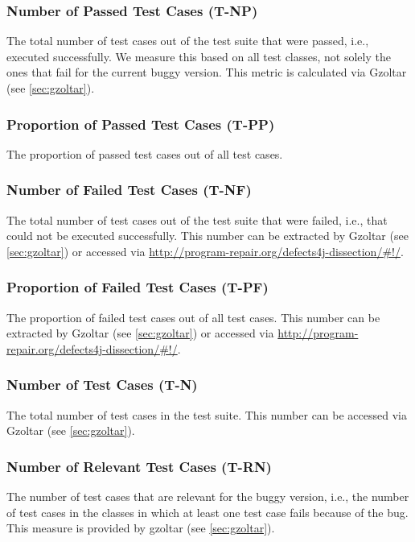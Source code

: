 \documentclass{scrartcl}
\begin{document}
\subsubsection{Number of Passed Test Cases (T-NP)}

The total number of test cases out of the test suite that were passed, i.e.,
executed successfully. We measure this based on all test classes, not solely
the ones that fail for the current buggy version. This metric is calculated via
Gzoltar (see \ref{sec:gzoltar}).

\subsubsection{Proportion of Passed Test Cases (T-PP)}

The proportion of passed test cases out of all test cases.

\subsubsection{Number of Failed Test Cases (T-NF)}

The total number of test cases out of the test suite that were failed, i.e.,
that could not be executed successfully. This number can be extracted by Gzoltar
(see \ref{sec:gzoltar}) or accessed via
\url{http://program-repair.org/defects4j-dissection/#!/}.

\subsubsection{Proportion of Failed Test Cases (T-PF)}

The proportion of failed test cases out of all test cases. This number can be
extracted by Gzoltar (see \ref{sec:gzoltar}) or accessed via
\url{http://program-repair.org/defects4j-dissection/#!/}.

\subsubsection{Number of Test Cases (T-N)}
The total number of test cases in the test suite. This number can be accessed
via Gzoltar (see \ref{sec:gzoltar}).

\subsubsection{Number of Relevant Test Cases (T-RN)}

The number of test cases that are relevant for the buggy version, i.e., the
number of test cases in the classes in which at least one test case fails
because of the bug. This measure is provided by gzoltar (see \ref{sec:gzoltar}).
\end{document}
